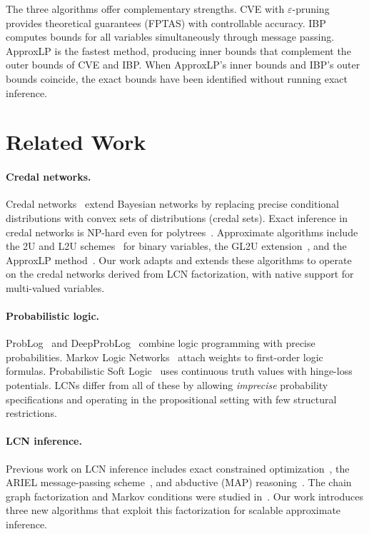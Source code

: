 \documentclass{article}
\begin{document}
The three algorithms offer complementary strengths. CVE with $\varepsilon$-pruning provides theoretical guarantees (FPTAS) with controllable accuracy. IBP computes bounds for all variables simultaneously through message passing. ApproxLP is the fastest method, producing inner bounds that complement the outer bounds of CVE and IBP. When ApproxLP's inner bounds and IBP's outer bounds coincide, the exact bounds have been identified without running exact inference.


\section{Related Work}
\label{sec-related}

\paragraph{Credal networks.} Credal networks~\cite{cozman2000credal} extend Bayesian networks by replacing precise conditional distributions with convex sets of distributions (credal sets). Exact inference in credal networks is NP-hard even for polytrees~\cite{maua2012anytime}. Approximate algorithms include the 2U and L2U schemes~\cite{ide2014credal} for binary variables, the GL2U extension~\cite{ide2014credal}, and the ApproxLP method~\cite{antonucci2013approximate,antonucci2015finite}. Our work adapts and extends these algorithms to operate on the credal networks derived from LCN factorization, with native support for multi-valued variables.

\paragraph{Probabilistic logic.} ProbLog~\cite{deraedt2007problog} and DeepProbLog~\cite{manhaeve2018deepproblog} combine logic programming with precise probabilities. Markov Logic Networks~\cite{richardson2006markov} attach weights to first-order logic formulas. Probabilistic Soft Logic~\cite{bach2017hinge} uses continuous truth values with hinge-loss potentials. LCNs differ from all of these by allowing \emph{imprecise} probability specifications and operating in the propositional setting with few structural restrictions.

\paragraph{LCN inference.} Previous work on LCN inference includes exact constrained optimization~\cite{marinescu2022neurips}, the ARIEL message-passing scheme~\cite{marinescu2023lcn}, and abductive (MAP) reasoning~\cite{marinescu2024neurips}. The chain graph factorization and Markov conditions were studied in~\cite{cozman2024ijar}. Our work introduces three new algorithms that exploit this factorization for scalable approximate inference.
\end{document}
